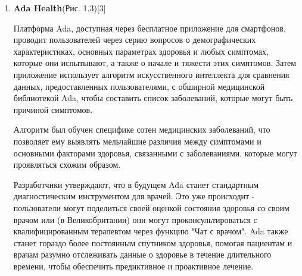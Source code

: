 \begin{enumerate}[label=\arabic*)]
\textbf{Недостатки:}
\begin{itemize}
    \item Платная услуга в большинстве случаев. Один из недостатков HealthTap заключается в том, что доступ к его услугам часто предполагает плату, что может ограничивать доступность для пользователей с ограниченными средствами.
    \item Не всегда доступно вне США. Географические ограничения могут сделать HealthTap менее доступным для пользователей за пределами Соединенных Штатов.
\end{itemize}

Сайт HealthTap представляет собой полезный и информативный ресурс о здоровье и медицине, который предлагает широкий спектр информации для пользователей.

Утверждение о том, что контент разрабатывается медицинскими специалистами и ссылки на научные исследования улучшают доверие к представленной информации.

Однако, как и в случае с любым другим медицинским ресурсом, важно проявлять осторожность и проверять информацию в других независимых источниках, особенно при решении серьезных медицинских вопросов.

  \item \textbf{ Ada Health}(Рис. 1.3)[3]

Платформа Ada, доступная через бесплатное приложение для смартфонов, проводит пользователей через серию вопросов о демографических характеристиках, основных параметрах здоровья и любых симптомах, которые они испытывают, а также о начале и тяжести этих симптомов. Затем приложение использует алгоритм искусственного интеллекта для сравнения данных, предоставленных пользователями, с обширной медицинской библиотекой Ada, чтобы составить список заболеваний, которые могут быть причиной симптомов.

Алгоритм был обучен специфике сотен медицинских заболеваний, что позволяет ему выявлять мельчайшие различия между симптомами и основными факторами здоровья, связанными с заболеваниями, которые могут проявляться схожим образом.

Разработчики утверждают, что в будущем Ada станет стандартным диагностическим инструментом для врачей. Это уже происходит - пользователи могут поделиться своей оценкой состояния здоровья со своим врачом или (в Великобритании) они могут проконсультироваться с квалифицированным терапевтом через функцию "Чат с врачом". Ada также станет гораздо более постоянным спутником здоровья, помогая пациентам и врачам разумно отслеживать данные о здоровье в течение длительного времени, чтобы обеспечить предиктивное и проактивное лечение.


\end{enumerate}
